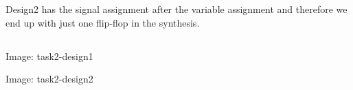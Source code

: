 \documentclass{article}
\begin{document}
Design2 has the signal assignment after the variable assignment and
therefore we end up with just one flip-flop in the synthesis.

\subsection{}
Image: task2-design1

Image: task2-design2

\subsection{}
\end{document}
